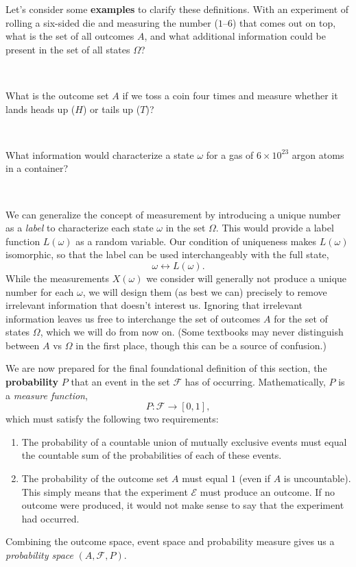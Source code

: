 \documentclass[12 pt]{article}
\newcommand{\cE}{\ensuremath{\mathcal E} }
\newcommand{\cF}{\ensuremath{\mathcal F} }
\newcommand{\om}{\ensuremath{\omega} }
\newcommand{\Om}{\ensuremath{\Omega} }
\newcommand{\llra}{\ensuremath{\longleftrightarrow} }
\newcommand{\X}{\ensuremath{\!\times\!} }
\begin{document}
Let's consider some \textbf{examples} to clarify these definitions.
With an experiment of rolling a six-sided die and measuring the number ($1$--$6$) that comes out on top, what is the set of all outcomes $A$, and what additional information could be present in the set of all states $\Om$?
\begin{mdframed}
  \ \\[100 pt]
\end{mdframed}
What is the outcome set $A$ if we toss a coin four times and measure whether it lands heads up ($H$) or tails up ($T$)?
\begin{mdframed}
  \ \\[100 pt]
\end{mdframed}
\newpage %
\noindent What information would characterize a state \om for a gas of $6\X 10^{23}$ argon atoms in a container?
\begin{mdframed}
  \ \\[100 pt]
\end{mdframed}

We can generalize the concept of measurement by introducing a unique number as a \textit{label} to characterize each state \om in the set $\Om$.
This would provide a label function $L(\om)$ as a random variable.
Our condition of uniqueness makes $L(\om)$ isomorphic, so that the label can be used interchangeably with the full state,
\begin{equation*}
  \om \llra L(\om).
\end{equation*}
While the measurements $X(\om)$ we consider will generally not produce a unique number for each $\om$, we will design them (as best we can) precisely to remove irrelevant information that doesn't interest us.
Ignoring that irrelevant information leaves us free to interchange the set of outcomes $A$ for the set of states $\Om$, which we will do from now on.
(Some textbooks may never distinguish between $A$ vs \Om in the first place, though this can be a source of confusion.)

We are now prepared for the final foundational definition of this section, the \textbf{probability} $P$ that an event in the set \cF has of occurring.
Mathematically, $P$ is a \textit{measure function},
\begin{equation*}
  P: \cF \to [0, 1],
\end{equation*}
which must satisfy the following two requirements: \\[-24 pt]
\begin{enumerate}
  \item The probability of a countable union of mutually exclusive events must equal the countable sum of the probabilities of each of these events.
  \item The probability of the outcome set $A$ must equal $1$ (even if $A$ is uncountable).
        This simply means that the experiment \cE must produce an outcome.
        If no outcome were produced, it would not make sense to say that the experiment had occurred.
\end{enumerate}
Combining the outcome space, event space and probability measure gives us a \textit{probability space} $(A, \cF, P)$.
\end{document}
